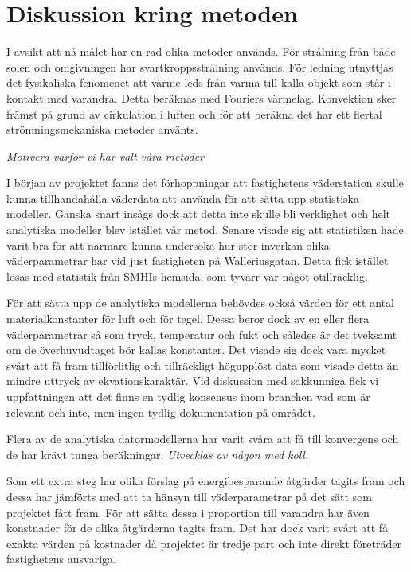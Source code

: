 \section{Diskussion kring metoden}

I avsikt att nå målet har en rad olika metoder används. För strålning från både solen och omgivningen har svartkroppsstrålning används. För ledning utnyttjas det fysikaliska fenomenet att värme leds från varma till kalla objekt som står i kontakt med varandra. Detta beräknas med Fouriers värmelag. Konvektion sker främst på grund av cirkulation i luften och för att beräkna det har ett flertal strömningsmekaniska metoder använts.

\emph{\color{red} Motivera varför vi har valt våra metoder}

I början av projektet fanns det förhoppningar att fastighetens väderstation skulle kunna tillhandahålla väderdata att använda för att sätta upp statistiska modeller. 
Ganska snart insågs dock att detta inte skulle bli verklighet och helt analytiska modeller blev istället vår metod. Senare visade sig att statistiken hade varit bra för att närmare kunna undersöka hur stor inverkan olika väderparametrar har vid just fastigheten på Walleriusgatan. 
Detta fick istället lösas med statistik från SMHIs hemsida, som tyvärr var något otillräcklig.

För att sätta upp de analytiska modellerna behövdes också värden för ett antal materialkonstanter för luft och för tegel. 
Dessa beror dock av en eller flera väderparametrar så som tryck, temperatur och fukt och således är det tveksamt om de överhuvudtaget bör kallas konstanter. 
Det visade sig dock vara mycket svårt att få fram tillförlitlig och tillräckligt högupplöst data som visade detta än mindre uttryck av ekvationskaraktär.
Vid diskussion med sakkunniga fick vi uppfattningen att det finns en tydlig konsensus inom branchen vad som är relevant och inte, men ingen tydlig dokumentation på området.

Flera av de analytiska datormodellerna har varit svåra att få till konvergens och de har krävt tunga beräkningar. \emph{\color{red} Utvecklas av någon med koll.}

Som ett extra steg har olika förslag på energibesparande åtgärder tagits fram och dessa har jämförts med att ta hänsyn till väderparametrar på det sätt som projektet fått fram. För att sätta dessa i proportion till varandra har även konstnader för de olika åtgärderna tagits fram. Det har dock varit svårt att få exakta värden på kostnader då projektet är tredje part och inte direkt företräder fastighetens ansvariga.
